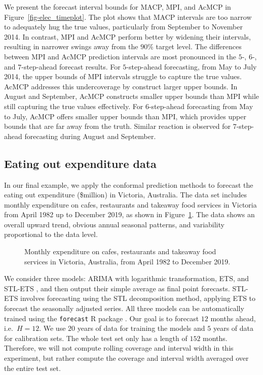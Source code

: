 \documentclass[
  11pt,
  12pt]{article}
\theoremstyle{plain}
\theoremstyle{remark}
\begin{document}
We present the forecast interval bounds for MACP, MPI, and AcMCP in
Figure~\ref{fig-elec_timeplot}. The plot shows that MACP intervals are
too narrow to adequately hug the true values, particularly from
September to November 2014. In contrast, MPI and AcMCP perform better by
widening their intervals, resulting in narrower swings away from the
\(90\%\) target level. The differences between MPI and AcMCP prediction
intervals are most pronounced in the \(5\)-, \(6\)-, and
\(7\)-step-ahead forecast results. For \(5\)-step-ahead forecasting,
from May to July 2014, the upper bounds of MPI intervals struggle to
capture the true values. AcMCP addresses this undercoverage by construct
larger upper bounds. In August and September, AcMCP constructs smaller
upper bounds than MPI while still capturing the true values effectively.
For \(6\)-step-ahead forecasting from May to July, AcMCP offers smaller
upper bounds than MPI, which provides upper bounds that are far away
from the truth. Similar reaction is observed for \(7\)-step-ahead
forecasting during August and September.

\subsection{Eating out expenditure
data}\label{eating-out-expenditure-data}

In our final example, we apply the conformal prediction methods to
forecast the eating out expenditure (\$million) in Victoria, Australia.
The data set includes monthly expenditure on cafes, restaurants and
takeaway food services in Victoria from April 1982 up to December 2019,
as shown in Figure~\ref{fig-cafe_data}. The data shows an overall upward
trend, obvious annual seasonal patterns, and variability proportional to
the data level.

\begin{figure}


\caption{\label{fig-cafe_data}Monthly expenditure on cafes, restaurants
and takeaway food services in Victoria, Australia, from April 1982 to
December 2019.}

\end{figure}%

We consider three models: ARIMA with logarithmic transformation, ETS,
and STL-ETS \citep{hyndman2021}, and then output their simple average as
final point forecasts. STL-ETS involves forecasting using the STL
decomposition method, applying ETS to forecast the seasonally adjusted
series. All three models can be automatically trained using the
\texttt{forecast} R package \citep{hyndman2024}. Our goal is to forecast
\(12\) months ahead, i.e.~\(H=12\). We use \(20\) years of data for
training the models and \(5\) years of data for calibration sets. The
whole test set only has a length of \(152\) months. Therefore, we will
not compute rolling coverage and interval width in this experiment, but
rather compute the coverage and interval width averaged over the entire
test set.
\end{document}
